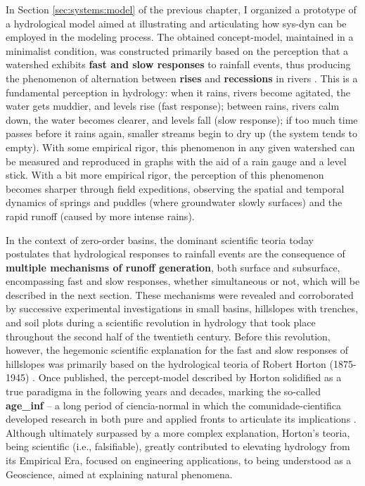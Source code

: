 \documentclass[./main_en.tex]{subfiles}
\begin{document}
\par In Section \ref{sec:systems:model} of the previous chapter, I organized a prototype of a hydrological \gls{model} aimed at illustrating and articulating how \gls{sys-dyn} can be employed in the modeling process. The obtained \gls{concept-model}, maintained in a minimalist condition, was constructed primarily based on the perception that a watershed exhibits \textbf{fast and slow responses} to rainfall events, thus producing the phenomenon of alternation between \textbf{rises} and \textbf{recessions} in rivers \cite{Hewlett1967}. This is a fundamental perception in \gls{hydrology}: when it rains, rivers become agitated, the water gets muddier, and levels rise (fast response); between rains, rivers calm down, the water becomes clearer, and levels fall (slow response); if too much time passes before it rains again, smaller streams begin to dry up (the \gls{system} tends to empty). With some empirical rigor, this phenomenon in any given watershed can be measured and reproduced in graphs with the aid of a rain gauge and a level stick. With a bit more empirical rigor, the perception of this phenomenon becomes sharper through field expeditions, observing the spatial and temporal dynamics of springs and puddles (where groundwater slowly surfaces) and the rapid runoff (caused by more intense rains).

\par In the context of zero-order basins, the dominant scientific \gls{teoria} today postulates that hydrological responses to rainfall events are the consequence of \textbf{multiple mechanisms of runoff generation}, both surface and subsurface, encompassing fast and slow responses, whether simultaneous or not, which will be described in the next section. These mechanisms were revealed and corroborated by successive experimental investigations in small basins, hillslopes with trenches, and soil plots during a scientific revolution in \gls{hydrology} that took place throughout the second half of the twentieth century. Before this revolution, however, the hegemonic scientific explanation for the fast and slow responses of hillslopes was primarily based on the hydrological \gls{teoria} of Robert Horton (1875-1945) \cite{Horton1933, Beven2004a}. Once published, the \gls{percept-model} described by Horton solidified as a true \gls{paradigma} in the following years and decades, marking the so-called \textbf{\gls{age_inf}} -- a long period of \gls{ciencia-normal} in which the \gls{comunidade-cientifica} developed research in both pure and applied fronts to articulate its implications \cite{Cook1946, Beven2021b}. Although ultimately surpassed by a more complex explanation, Horton’s \gls{teoria}, being scientific (i.e., falsifiable), greatly contributed to elevating \gls{hydrology} from its Empirical Era, focused on engineering applications, to being understood as a Geoscience, aimed at explaining natural phenomena.
\end{document}
